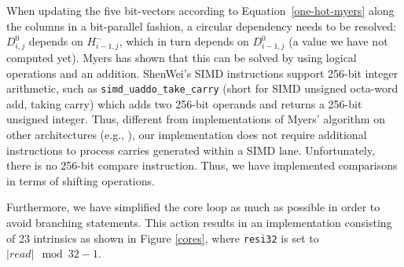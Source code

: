 \documentclass[conference]{IEEEtran}
\begin{document}
When updating the five bit-vectors according to Equation~\ref{one-hot-myers} along the columns in a bit-parallel fashion, a circular dependency needs to be resolved: $D^0_{i,j}$ depends on $H^-_{i-1, j}$, which in turn depends on $D^0_{i-1,j}$ (a value we have not computed yet). Myers \cite{myers} has shown that this can be solved by using logical operations and an addition. ShenWei's SIMD instructions support 256-bit integer arithmetic, such as \texttt{simd\_uaddo\_take\_carry} (short for SIMD unsigned octa-word add, taking carry) which adds two 256-bit operands and returns a 256-bit unsigned integer. Thus, different from implementations of Myers' algorithm on other architectures (e.g., \cite{chacon}), our implementation does not require additional instructions to process carries generated within a SIMD lane. Unfortunately, there is no 256-bit compare instruction. Thus, we have implemented comparisons in terms of shifting operations. 

Furthermore, we have simplified the core loop as much as possible in order to avoid branching statements. This action results in an implementation consisting of 23 intrinsics as shown in Figure \ref{cores}, where \texttt{resi32} is set to $|read|\mod 32 - 1$. 
\end{document}
